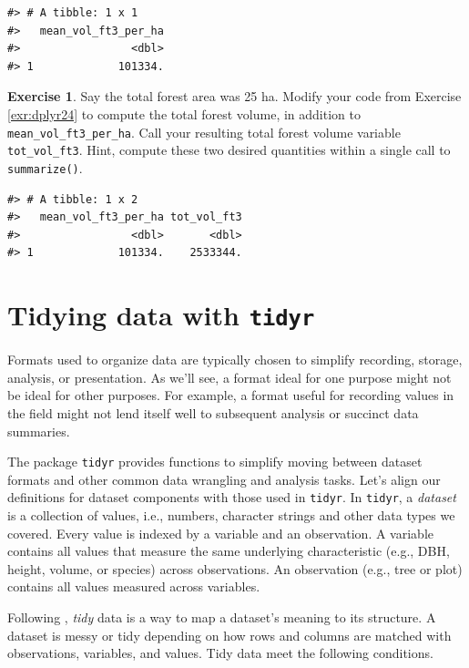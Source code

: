 \documentclass[
  11pt,
]{krantz}
\theoremstyle{definition}
\theoremstyle{definition}
\theoremstyle{definition}
\newtheorem{exercise}{Exercise}[chapter]
\theoremstyle{definition}
\theoremstyle{remark}
\begin{document}
\begin{verbatim}
#> # A tibble: 1 x 1
#>   mean_vol_ft3_per_ha
#>                 <dbl>
#> 1             101334.
\end{verbatim}

\begin{exercise}
\protect\hypertarget{exr:exr:dplyrLast}{}\label{exr:exr:dplyrLast}Say the total forest area was 25 ha. Modify your code from Exercise \ref{exr:dplyr24} to compute the total forest volume, in addition to \texttt{mean\_vol\_ft3\_per\_ha}. Call your resulting total forest volume variable \texttt{tot\_vol\_ft3}. Hint, compute these two desired quantities within a single call to \texttt{summarize()}.
\end{exercise}

\begin{verbatim}
#> # A tibble: 1 x 2
#>   mean_vol_ft3_per_ha tot_vol_ft3
#>                 <dbl>       <dbl>
#> 1             101334.    2533344.
\end{verbatim}

\hypertarget{tidyr}{%
\chapter{\texorpdfstring{Tidying data with \texttt{tidyr}}{Tidying data with tidyr}}\label{tidyr}}

Formats used to organize data are typically chosen to simplify recording, storage, analysis, or presentation. As we'll see, a format ideal for one purpose might not be ideal for other purposes. For example, a format useful for recording values in the field might not lend itself well to subsequent analysis or succinct data summaries.

The package \texttt{tidyr} provides functions to simplify moving between dataset formats and other common data wrangling and analysis tasks. Let's align our definitions for dataset components with those used in \texttt{tidyr}. In \texttt{tidyr}, a \emph{dataset} is a collection of values, i.e., numbers, character strings and other data types we covered. Every value is indexed by a variable and an observation. A variable contains all values that measure the same underlying characteristic (e.g., DBH, height, volume, or species) across observations. An observation (e.g., tree or plot) contains all values measured across variables.

Following \citet{wickham2023}, \emph{tidy} data is a way to map a dataset's meaning to its structure. A dataset is messy or tidy depending on how rows and columns are matched with observations, variables, and values. Tidy data meet the following conditions.
\end{document}
